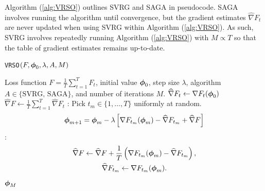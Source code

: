 %
%
%
%
Algorithm (\ref{alg:VRSO}) outlines SVRG and SAGA in pseudocode. SAGA involves running the algorithm until convergence, but the gradient estimates $\widehat \nabla F_t$ are never updated when using SVRG within Algorithm (\ref{alg:VRSO}). As such, SVRG involves repeatedly running Algorithm (\ref{alg:VRSO}) with $M \propto T$ so that the table of gradient estimates remains up-to-date.

\begin{algorithm}
\caption{\texttt{VRSO}$(F,\boldsymbol{\phi}_0,\lambda,A,M)$}\label{alg:VRSO}
\begin{algorithmic}[1]
\Require Loss function $F = \frac{1}{T}\sum_{t=1}^T F_t$, initial value $\boldsymbol{\phi}_0$, step size $\lambda$, algorithm $A \in \{\text{SVRG, SAGA}\}$, and number of iterations $M$.
%
\vspace{5pt}
 
\State $\widehat \nabla F_t \leftarrow \nabla F_t (\boldsymbol{\phi}_0)$
\EndFor
\State $\widehat \nabla F \gets \frac{1}{T} \sum_{t=1}^T \widehat \nabla F_{t}$
%
:
    \State Pick $t_{m} \in \{1,\ldots,T\}$ uniformly at random.
    \State {}
    \begin{gather}
        \boldsymbol{\phi}_{m+1} = \boldsymbol{\phi}_{m} - \lambda \left[\nabla F_{t_m}(\boldsymbol{\phi}_{m}) - \widehat \nabla F_{t_{m}} + \widehat \nabla F \right]
        \label{eqn:SAGA_update0}
    \end{gather}
    :
        \begin{gather}
            \widehat \nabla F \gets \widehat \nabla F + \frac{1}{T} \left( \nabla F_{t_m}(\boldsymbol{\phi}_{m}) - \widehat \nabla F_{t_{m}}\right), \\
            \widehat \nabla F_{t_{m}} \gets \nabla F_{t_m}(\boldsymbol{\phi}_{m}).
        \end{gather}
    \EndIf
\EndFor
\State \Return $\boldsymbol{\phi}_M$
\end{algorithmic}
\end{algorithm}





